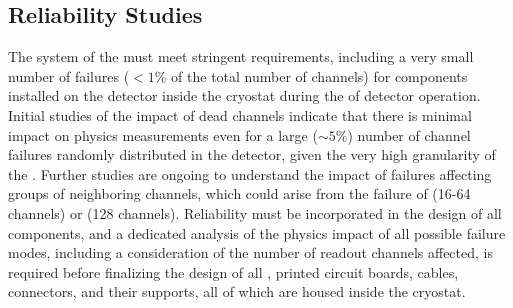 \subsection{Reliability Studies}
\label{sec:fdsp-tpcelec-qa-reliability}

The   system of the    must meet 
stringent requirements, including a very small number of failures ($<\num{1}$\% of the total number of
channels) for components installed 
on the detector inside the cryostat during the \dunelifetime of 
detector operation. Initial studies of the impact of dead channels indicate
that there is minimal impact on physics measurements even for a large ($\sim5$\%) number of 
channel failures randomly distributed in the detector, given the very high granularity of the . 
Further studies are ongoing to understand the impact of failures 
affecting groups of neighboring channels, which could arise from the failure of  
(16-64 channels) or  (128 channels). Reliability must be incorporated in the 
design of all components, and a dedicated analysis of the physics impact of all 
possible failure modes, including a consideration of the number of readout channels
affected, is required before finalizing the design of all , printed circuit 
boards, cables, connectors, and their supports, all of which are housed inside the 
  cryostat. 

